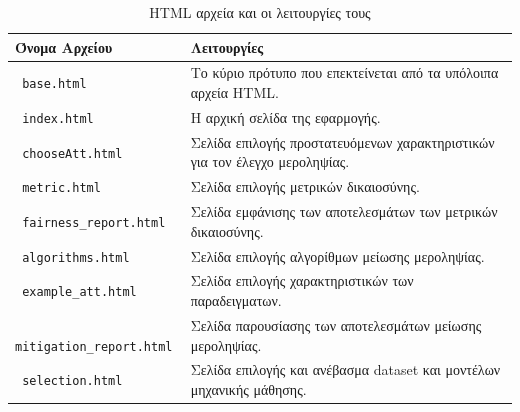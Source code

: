 \documentclass[12pt,twoside]{article}
\newcommand{\en}{\selectlanguage{english}}
\newcommand{\gr}{\selectlanguage{greek}}
\begin{document}
\newpage
\begin{table}[H]
\centering
\caption{\en HTML  \gr αρχεία και οι λειτουργίες τους}
\begin{tabular}{|l|p{10cm}|}
\hline
\textbf{\gr Όνομα Αρχείου} & \textbf{\gr Λειτουργίες} \\ \hline
\texttt{ \en base.html} & \gr Το κύριο πρότυπο που επεκτείνεται από τα υπόλοιπα αρχεία \en HTML\gr. \\ \hline
\texttt{ \en index.html} & \gr Η αρχική σελίδα της εφαρμογής. \\ \hline
\texttt{ \en chooseAtt.html} & \gr Σελίδα επιλογής προστατευόμενων χαρακτηριστικών για τον έλεγχο μεροληψίας. \\ \hline
\texttt{ \en metric.html} & \gr Σελίδα επιλογής μετρικών δικαιοσύνης. \\ \hline
\texttt{ \en fairness\_report.html} & \gr Σελίδα εμφάνισης των αποτελεσμάτων των μετρικών δικαιοσύνης. \\ \hline
\texttt{ \en algorithms.html} & \gr Σελίδα επιλογής αλγορίθμων μείωσης μεροληψίας. \\ \hline
\texttt{ \en example\_att.html} & \gr Σελίδα επιλογής χαρακτηριστικών των παραδειγματων. \\ \hline
\texttt{ \en mitigation\_report.html} & \gr Σελίδα παρουσίασης των αποτελεσμάτων μείωσης μεροληψίας. \\ \hline
\texttt{ \en selection.html} & \gr Σελίδα επιλογής και ανέβασμα dataset και μοντέλων μηχανικής μάθησης. \\ \hline
\end{tabular}
\end{table}

\newpage
\end{document}
